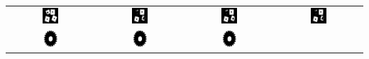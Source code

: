 \documentclass[main]{subfiles}
\begin{document}
\begin{table}
\begin{tabular}{c||c|c|c}
\includegraphics[width=0.2\textwidth]{img/res/e1a/alg1tipo1-block.jpg} &
\includegraphics[width=0.2\textwidth]{img/res/e1a/alg1tipo6-block.jpg} &
\includegraphics[width=0.2\textwidth]{img/res/e1a/alg1tipo6d0.75-block.jpg} &
\includegraphics[width=0.2\textwidth]{img/res/e1a/alg1tipo6d1.25-block.jpg} \\
\includegraphics[width=0.2\textwidth]{img/res/e1a/alg1tipo1-02.jpg} &
\includegraphics[width=0.2\textwidth]{img/res/e1a/alg1tipo6-02.jpg} &
\includegraphics[width=0.2\textwidth]{img/res/e1a/alg1tipo6d0.75-02.jpg} &

\end{tabular}
\end{table}
\end{document}

